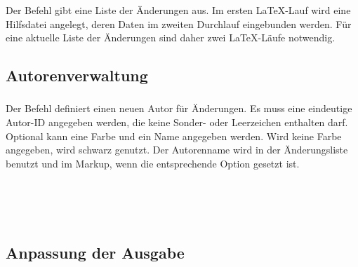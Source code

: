 \subsubsection{}
\DescribeMacro{\listofchanges}

Der Befehl  gibt eine Liste der Änderungen aus.
Im ersten \LaTeX-Lauf wird eine Hilfsdatei angelegt, deren Daten im zweiten Durchlauf eingebunden werden.
Für eine aktuelle Liste der Änderungen sind daher zwei \LaTeX-Läufe notwendig.
\begin{einspiel}
	\>
\end{einspiel}


\subsection{Autorenverwaltung}
\label{sec:user:authormanagement}

\subsubsection{}

Der Befehl  definiert einen neuen Autor für Änderungen.
Es muss eine eindeutige Autor-ID angegeben werden, die keine Sonder- oder Leerzeichen enthalten darf.
Optional kann eine Farbe und ein Name angegeben werden.
Wird keine Farbe angegeben, wird schwarz genutzt.
Der Autorenname wird in der Änderungsliste benutzt und im Markup, wenn die entsprechende Option gesetzt ist.
\begin{einspiel}
	\>
\end{einspiel}

\begin{einspiel}[true]
	\>\\
	\>\\
	\>\\
	\>
\end{einspiel}

\subsection{Anpassung der Ausgabe}
\label{sec:user:customizingoutput}


